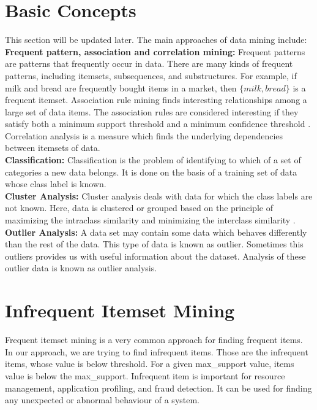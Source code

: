 %
%


\section{Basic Concepts}
 This section will be updated later.
 \iffalse
The main approaches of data mining include:\\
\textbf{Frequent pattern, association and correlation mining:}
Frequent patterns are patterns that frequently occur in data. There are many kinds of frequent patterns, including itemsets, subsequences, and substructures. For example, if milk and bread are frequently bought items in a market, then $\{milk, bread\}$ is a frequent itemset. 
Association rule mining finds interesting relationships among a large set of data items. The association rules are considered interesting if they satisfy both a minimum support threshold and a minimum confidence threshold \cite{book}.
Correlation analysis is a measure which finds the underlying dependencies between itemsets of data.\\
%
\textbf{Classification:}
Classification is the problem of identifying to which of a set of categories a new data belongs. It is done on the basis of a training set of data whose class label is known.\\
%
\textbf{Cluster Analysis:}
Cluster analysis deals with data for which the class labels are not known. Here, data is clustered or grouped based on the principle of maximizing the intraclass similarity and minimizing the interclass similarity \cite{book}. \\
%
\textbf{Outlier Analysis:}
A data set may contain some data which behaves differently than the rest of the data. This type of data is known as outlier. Sometimes this outliers provides us with useful information about the dataset. Analysis of these outlier data is known as outlier analysis.  
%
\section{Infrequent Itemset Mining} \label{sec:graph_mining}
%
Frequent itemset mining is a very common approach for finding frequent items. In our approach, we are trying to find infrequent items. Those  are the infrequent items, whose value is below threshold. For a given max{\_}support value, items value is below the max{\_}support. Infrequent item is important for resource management, application profiling, and fraud detection. It can be used for finding any unexpected or abnormal behaviour of a system. 

